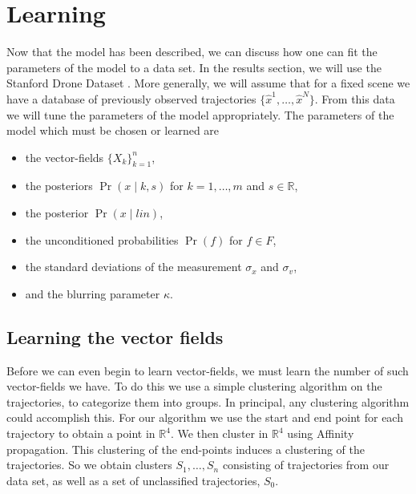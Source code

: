 \documentclass[conference]{IEEEtran}
\begin{document}
\section{Learning} \label{sec:learning}
  Now that the model has been described, we can discuss how one can fit the parameters of the model to a data set.
  In the results section, we will use the Stanford Drone Dataset \cite{StanfordDroneData}.
  More generally, we will assume that for a fixed scene we have a database of previously observed trajectories $\{ \hat{x}^1, \dots, \hat{x}^N\}$.
  From this data we will tune the parameters of the model appropriately.
  The parameters of the model which must be chosen or learned are
  \begin{itemize}
  	\item the vector-fields $\{ X_k\}_{k=1}^{n}$,
	\item the posteriors $\Pr(x \mid k,s)$ for $k=1,\dots,m$ and $s \in \mathbb{R}$,
	\item the posterior $\Pr(x \mid lin)$,
	\item the unconditioned probabilities $\Pr(f)$ for $f \in F$,
	\item the standard deviations of the measurement $\sigma_x$ and $\sigma_v$,
	\item and the blurring parameter $\kappa$.
  \end{itemize}
  
  \subsection{Learning the vector fields}
  Before we can even begin to learn vector-fields, we must learn the number of such vector-fields we have.
  To do this we use a simple clustering algorithm on the trajectories, to categorize them into groups.
  In principal, any clustering algorithm could accomplish this.
  For our algorithm we use the start and end point for each trajectory to obtain a point in $\mathbb{R}^4$.
  We then cluster in $\mathbb{R}^4$ using Affinity propagation.
  This clustering of the end-points induces a clustering of the trajectories.
  So we obtain clusters $S_1, \dots, S_n$ consisting of trajectories from our data set, as well as a set of unclassified trajectories, $S_0$.
  
\end{document}
